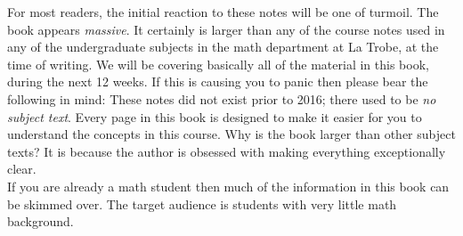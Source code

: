 For most readers, the initial reaction to these notes will be one of turmoil. The book appears \textit{massive}. It certainly is larger than any of the course notes used in any of the undergraduate subjects in the math department at La Trobe, at the time of writing. We will be covering basically all of the material in this book, during the next 12 weeks. If this is causing you to panic then please bear the following in mind: These notes did not exist prior to 2016; there used to be \textit{no subject text}. Every page in this book is designed to make it easier for you to understand the concepts in this course. Why is the book larger than other subject texts? It is because the author is obsessed with making everything exceptionally clear. \\

If you are already a math student then much of the information in this book can be skimmed over. The target audience is students with very little math background.